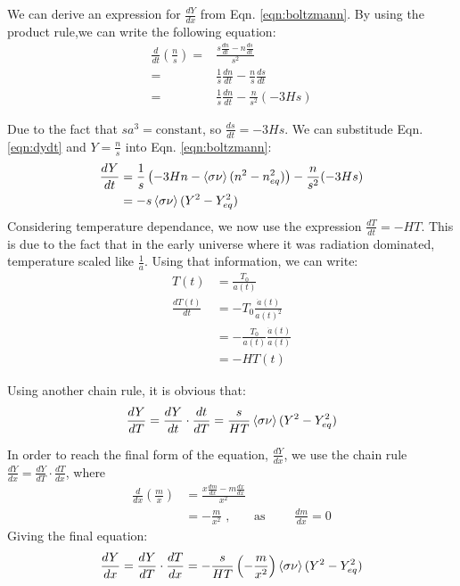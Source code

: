 \documentclass[12pt]{article}
\begin{document}
We can derive an expression for $\frac{dY}{dx}$ from Eqn. \ref{eqn:boltzmann}. By using the product rule,we can write the following equation:
\begin{equation}
    \begin{split}
        \frac{d}{dt} \left(\frac{n}{s} \right) =& \frac{s\frac{dn}{dt} - n\frac{ds}{dt}}{s^2}
        \\=& \frac{1}{s}\frac{dn}{dt} - \frac{n}{s}\frac{ds}{dt}
        \\=& \frac{1}{s}\frac{dn}{dt} - \frac{n}{s^2}(-3Hs)
    \end{split}
    \label{eqn:dydt}
\end{equation}

Due to the fact that $sa^3 = \text{constant}$, so $\frac{ds}{dt} = -3Hs$. We can substitude Eqn. \ref{eqn:dydt} and $Y = \frac{n}{s}$ into Eqn. \ref{eqn:boltzmann}:
\begin{equation}
    \begin{split}
        \frac{dY}{dt} &= \frac{1}{s}\left(-3Hn - \braket{\sigma\nu}(n^2 - n^2_{eq})\right) - \frac{n}{s^2}(-3Hs)
        \\&= -s\braket{\sigma\nu}(Y^2 - Y^2_{eq})
    \end{split}
\end{equation}
Considering temperature dependance, we now use the expression $\frac{dT}{dt} = -HT$. This is due to the fact that in the early universe where it was radiation dominated, temperature scaled like $\frac{1}{a}$. Using that information, we can write:
\begin{equation}
    \begin{split}
            T(t) &= \frac{T_0}{a(t)}
            \\ \frac{dT(t)}{dt} &= -T_0\frac{\dot a(t)}{a(t)^2}
            \\ &= -\frac{T_0}{a(t)}\frac{\dot a(t)}{a(t)}
            \\ &= -HT(t)
    \end{split}
\end{equation}

Using another chain rule, it is obvious that:
\begin{equation}
    \frac{dY}{dT} = \frac{dY}{dt}\cdot\frac{dt}{dT} = \frac{s}{HT}\braket{\sigma\nu}(Y^2 - Y^2_{eq})
\end{equation}

In order to reach the final form of the equation, $\frac{dY}{dx}$, we use the chain rule $\frac{dY}{dx} = \frac{dY}{dT}\cdot\frac{dT}{dx}$, where 
\begin{equation}
    \begin{split}
        \frac{d}{dx}\left(\frac{m}{x}\right) &= \frac{x\frac{dm}{dx} - m\frac{dx}{dx}}{x^2} 
        \\ &= -\frac{m}{x^2} \text{ ,}\qquad \text{as }\qquad \frac{dm}{dx}= 0
    \end{split}
\end{equation}
Giving the final equation:
\begin{equation}
        \frac{dY}{dx} = \frac{dY}{dT}\cdot\frac{dT}{dx} = -\frac{s}{HT}\left(-\frac{m}{x^2}\right)\braket{\sigma\nu}(Y^2 - Y^2_{eq})
\end{equation}
\end{document}
